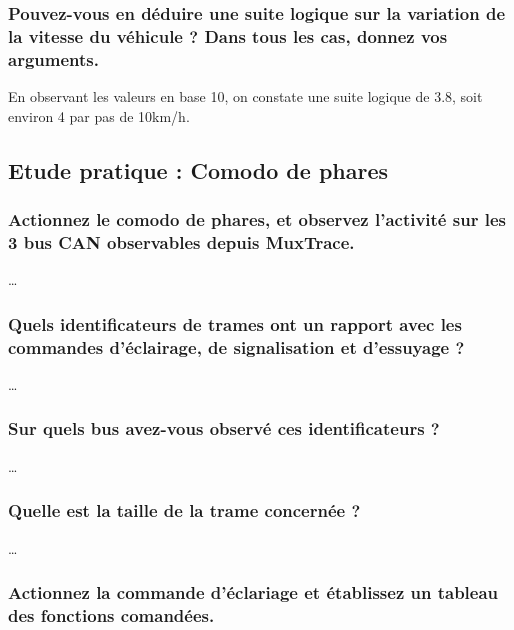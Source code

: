 \documentclass{rapportECC}
\begin{document}
\subsubsection*{Pouvez-vous en déduire une suite logique sur la variation de la vitesse du véhicule ? Dans tous les cas, donnez vos arguments.}

En observant les valeurs en base 10, on constate une suite logique de 3.8, soit environ 4 par pas de 10km/h.

\subsection{Etude pratique : Comodo de phares}

\subsubsection*{Actionnez le comodo de phares, et observez l'activité sur les 3 bus CAN observables depuis MuxTrace.}

\dots

\subsubsection*{Quels identificateurs de trames ont un rapport avec les commandes d'éclairage, de signalisation et d'essuyage ?}

\dots

\subsubsection*{Sur quels bus avez-vous observé ces identificateurs ?}

\dots

\subsubsection*{Quelle est la taille de la trame concernée ?}

\dots

\subsubsection*{Actionnez la commande d'éclariage et établissez un tableau des fonctions comandées.}
\end{document}
